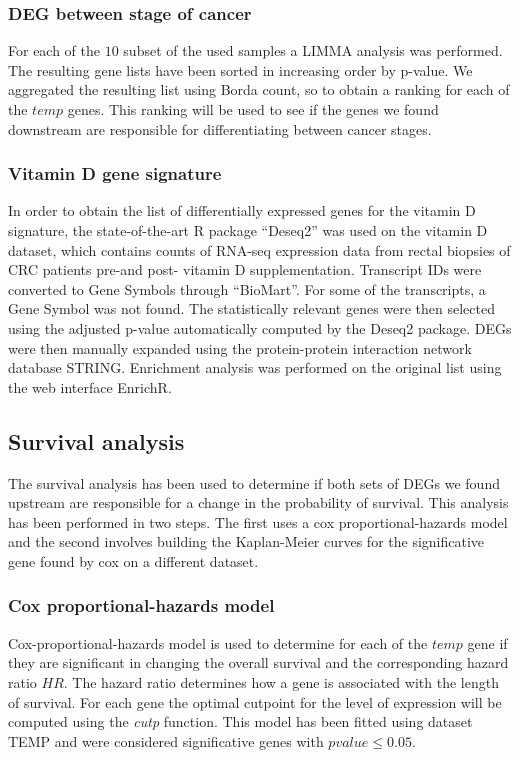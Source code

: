 \documentclass[fleqn,10pt]{SelfArx} %
\begin{document}
		\subsubsection{DEG between stage of cancer}
		For each of the $10$ subset of the used samples a LIMMA analysis was performed.
		The resulting gene lists have been sorted in increasing order by p-value.
		We aggregated the resulting list using Borda count, so to obtain a ranking for each of the $temp$ genes.
		This ranking will be used to see if the genes we found downstream are responsible for differentiating between cancer stages.

		\subsubsection{Vitamin D gene signature}
		In order to obtain the list of differentially expressed genes for the vitamin D signature, the state-of-the-art R package “Deseq2” was used on the vitamin D dataset, which contains counts of RNA-seq expression data from rectal biopsies of CRC patients pre-and post- vitamin D supplementation. Transcript IDs were converted to Gene Symbols through “BioMart”. For some of the transcripts, a Gene Symbol was not found. The statistically relevant genes were then selected using the adjusted p-value automatically computed by the Deseq2 package. DEGs were then manually expanded using the protein-protein interaction network database STRING.
Enrichment analysis was performed on the original list using the web interface EnrichR.


	\subsection{Survival analysis}
	The survival analysis has been used to determine if both sets of DEGs we found upstream are responsible for a change in the probability of survival.
	This analysis has been performed in two steps.
	The first uses a cox proportional-hazards model and the second involves building the Kaplan-Meier curves for the significative gene found by cox on a different dataset.

		\subsubsection{Cox proportional-hazards model}
		Cox-proportional-hazards model is used to determine for each of the $temp$ gene if they are significant in changing the overall survival and the corresponding hazard ratio $HR$.
		The hazard ratio determines how a gene is associated with the length of survival.
		For each gene the optimal cutpoint for the level of expression will be computed using the \emph{cutp} function.
		This model has been fitted using dataset TEMP and were considered significative genes with $pvalue \le 0.05$.
\end{document}
